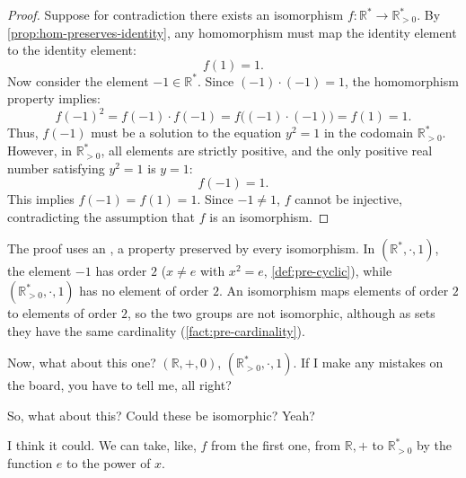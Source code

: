 \begin{content}
\begin{proof}
Suppose for contradiction there exists an isomorphism $f \colon \mathbb{R}^* \to \mathbb{R}^*_{>0}$.
By \cref{prop:hom-preserves-identity}, any homomorphism must map the identity element to the identity element:
\[
f(1) = 1.
\]
Now consider the element $-1 \in \mathbb{R}^*$. Since $(-1) \cdot (-1) = 1$, the homomorphism property implies:
\[
f(-1)^2 = f(-1) \cdot f(-1) = f\bigl((-1) \cdot (-1)\bigr) = f(1) = 1.
\]
Thus, $f(-1)$ must be a solution to the equation $y^2 = 1$ in the codomain $\mathbb{R}^*_{>0}$. However, in $\mathbb{R}^*_{>0}$, all elements are strictly positive, and the only positive real number satisfying $y^2 = 1$ is $y = 1$:
\[
f(-1) = 1.
\]
This implies $f(-1) = f(1) = 1$. Since $-1 \neq 1$, $f$ cannot be injective, contradicting the assumption that $f$ is an isomorphism.
\end{proof}

\begin{steps}
The proof uses an , a property preserved by every isomorphism. In $(\mathbb{R}^*, \cdot, 1)$, the element $-1$ has order $2$ ($x \neq e$ with $x^2 = e$, \cref{def:pre-cyclic}), while $(\mathbb{R}^*_{>0}, \cdot, 1)$ has no element of order $2$. An isomorphism maps elements of order $2$ to elements of order $2$, so the two groups are not isomorphic, although as sets they have the same cardinality (\cref{fact:pre-cardinality}).
\end{steps}
\end{content}

\begin{speech}[00:18:00 - 00:18:23]
Now, what about this one? 
$(\mathbb{R}, +, 0)$,
$(\mathbb{R}^*_{>0}, \cdot, 1)$.
If I make any mistakes on the board, you have to tell me, all right?

So, what about this? Could these be isomorphic? Yeah?
\end{speech}

\begin{student}
I think it could. We can take, like, $f$ from the first one, from $\mathbb{R}, +$ to $\mathbb{R}^*_{>0}$ by the function $e$ to the power of $x$.
\end{student}

